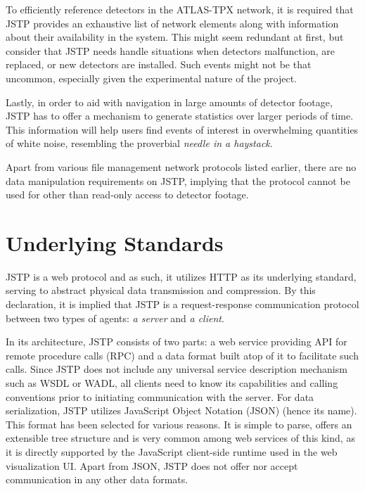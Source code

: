 To efficiently reference detectors in the ATLAS-TPX network, it is required that JSTP provides an exhaustive list of network elements along with information about their availability in the system. This might seem redundant at first, but consider that JSTP needs handle situations when detectors malfunction, are replaced, or new detectors are installed. Such events might not be that uncommon, especially given the experimental nature of the project.

Lastly, in order to aid with navigation in large amounts of detector footage, JSTP has to offer a mechanism to generate statistics over larger periods of time. This information will help users find events of interest in overwhelming quantities of white noise, resembling the proverbial \textit{needle in a haystack}.

Apart from various file management network protocols listed earlier, there are no data manipulation requirements on JSTP, implying that the protocol cannot be used for other than read-only access to detector footage.

\section{Underlying Standards}
JSTP is a web protocol and as such, it utilizes HTTP as its underlying standard, serving to abstract physical data transmission and compression. By this declaration, it is implied that JSTP is a request-response communication protocol between two types of agents: \textit{a server} and \textit{a client}.

In its architecture, JSTP consists of two parts: a web service providing API for remote procedure calls (RPC) and a data format built atop of it to facilitate such calls. Since JSTP does not include any universal service description mechanism such as WSDL or WADL, all clients need to know its capabilities and calling conventions prior to initiating communication with the server. For data serialization, JSTP utilizes JavaScript Object Notation (JSON) (hence its name). This format has been selected for various reasons. It is simple to parse, offers an extensible tree structure and is very common among web services of this kind, as it is directly supported by the JavaScript client-side runtime used in the web visualization UI. Apart from JSON, JSTP does not offer nor accept communication in any other data formats.

